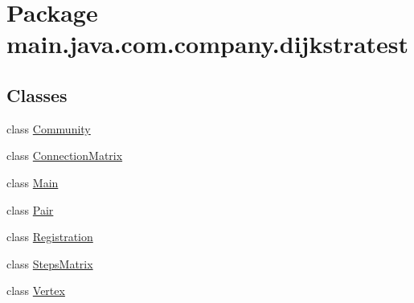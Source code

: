 \hypertarget{namespacemain_1_1java_1_1com_1_1company_1_1dijkstratest}{\section{Package main.\-java.\-com.\-company.\-dijkstratest}
\label{namespacemain_1_1java_1_1com_1_1company_1_1dijkstratest}
}
\subsection*{Classes}
\begin{DoxyCompactItemize}
\item 
class \hyperlink{classmain_1_1java_1_1com_1_1company_1_1dijkstratest_1_1_community}{Community}
\item 
class \hyperlink{classmain_1_1java_1_1com_1_1company_1_1dijkstratest_1_1_connection_matrix}{Connection\-Matrix}
\item 
class \hyperlink{classmain_1_1java_1_1com_1_1company_1_1dijkstratest_1_1_main}{Main}
\item 
class \hyperlink{classmain_1_1java_1_1com_1_1company_1_1dijkstratest_1_1_pair}{Pair}
\item 
class \hyperlink{classmain_1_1java_1_1com_1_1company_1_1dijkstratest_1_1_registration}{Registration}
\item 
class \hyperlink{classmain_1_1java_1_1com_1_1company_1_1dijkstratest_1_1_steps_matrix}{Steps\-Matrix}
\item 
class \hyperlink{classmain_1_1java_1_1com_1_1company_1_1dijkstratest_1_1_vertex}{Vertex}
\end{DoxyCompactItemize}
